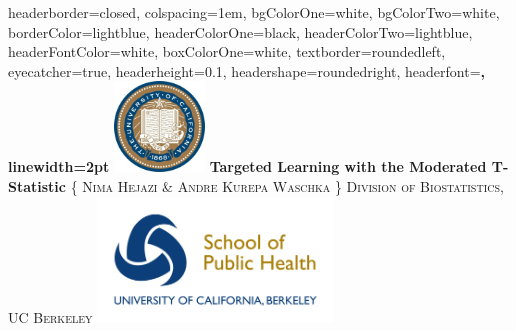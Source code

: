 \documentclass[landscape,a0paper,fontscale=0.285]{baposter} %
\begin{document}
\begin{poster}
{
headerborder=closed, %
colspacing=1em, %
bgColorOne=white, %
bgColorTwo=white, %
borderColor=lightblue, %
headerColorOne=black, %
headerColorTwo=lightblue, %
headerFontColor=white, %
boxColorOne=white, %
textborder=roundedleft, %
eyecatcher=true, %
headerheight=0.1\textheight, %
headershape=roundedright, %
headerfont=\Large\bf\textsc, %
linewidth=2pt %
}
%
{\includegraphics[height=6.5em]{logo_cal.jpg}} %
{\bf Targeted Learning with the Moderated T-Statistic \vspace{0.5em}} %
{\textsc{\{ Nima Hejazi \& Andre Kurepa Waschka \} \hspace{12pt} Division of Biostatistics, UC Berkeley}}
{\includegraphics[height=9em]{logo_sph.jpg}} %


\end{poster}
\end{document}
